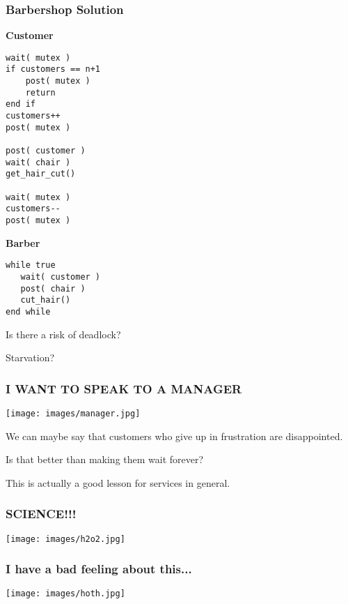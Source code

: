\begin{frame}[fragile]
	\frametitle{Barbershop Solution}

	\begin{multicols}{2}
		\textbf{Customer}
		\begin{lstlisting}
wait( mutex )
if customers == n+1
    post( mutex )
    return
end if
customers++
post( mutex )

post( customer )
wait( chair )
get_hair_cut()

wait( mutex )
customers--
post( mutex )
\end{lstlisting}
		\columnbreak
		\textbf{Barber}
		\begin{lstlisting}
while true
   wait( customer )
   post( chair )
   cut_hair()
end while
  \end{lstlisting}
	\end{multicols}

	Is there a risk of deadlock?

	Starvation?

\end{frame}


\begin{frame}
	\frametitle{I WANT TO SPEAK TO A MANAGER}
	
	\begin{center}
	\texttt{[image: images/manager.jpg]}
	\end{center}

	We can maybe say that customers who give up in frustration are disappointed.

	Is that better than making them wait forever?

	This is actually a good lesson for services in general.

\end{frame}


\begin{frame}
	\frametitle{SCIENCE!!!}

	\begin{center}
		\texttt{[image: images/h2o2.jpg]}
	\end{center}


\end{frame}


\begin{frame}
\frametitle{I have a bad feeling about this...}

\begin{center}
	\texttt{[image: images/hoth.jpg]}
\end{center}

\end{frame}


